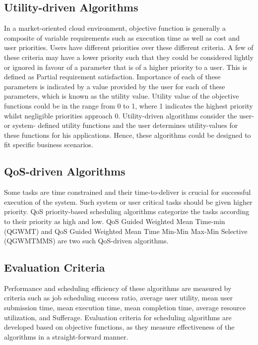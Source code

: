 \documentclass{llncs}
\begin{document}
\subsection{Utility-driven Algorithms}
In a market-oriented cloud environment, objective function is generally a composite of variable requirements such as execution time as well as cost and user priorities. Users have different priorities over these different criteria. A few of these criteria may have a lower priority such that they could be considered lightly or ignored in favour of a parameter that is of a higher priority to a user. This is defined as Partial requirement satisfaction. Importance of each of these parameters is indicated by a value provided by the user for each of these parameters, which is known as the utility value. Utility value of the objective functions could be in the range from 0 to 1, where 1 indicates the highest priority whilst negligible priorities approach 0. Utility-driven algorithms consider the user- or system- defined utility functions and the user determines utility-values for these functions for his applications. Hence, these algorithms could be designed to fit specific business scenarios.

\subsection{QoS-driven Algorithms}
Some tasks are time constrained and their time-to-deliver is crucial for successful execution of the system. Such system or user critical tasks should be given higher priority. QoS priority-based scheduling algorithms categorize the tasks according to their priority as high and low. QoS Guided Weighted Mean Time-min (QGWMT) and QoS Guided Weighted Mean Time Min-Min Max-Min Selective (QGWMTMMS) are two such QoS-driven algorithms\cite{qosgrid}.

\subsection{Evaluation Criteria}
Performance and scheduling efficiency of these algorithms are measured by criteria such as job scheduling success ratio, average user utility, mean user submission time, mean execution time, mean completion time, average resource utilization, and Sufferage. Evaluation criteria for scheduling algorithms are developed based on objective functions, as they measure effectiveness of the algorithms in a straight-forward manner.
\end{document}

